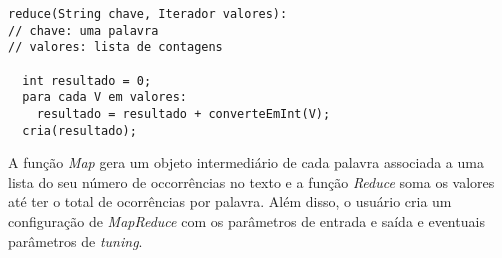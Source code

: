 \begin{lstlisting}[title={Código 2: Exemplo de função Reduce em pseudocódigo adaptado de \cite{MapReduce08}}]
reduce(String chave, Iterador valores):
// chave: uma palavra
// valores: lista de contagens

  int resultado = 0;
  para cada V em valores:
    resultado = resultado + converteEmInt(V);
  cria(resultado);
\end{lstlisting}

A função \textit{Map} gera um objeto intermediário de cada palavra associada a uma lista do seu número de occorrências no texto e a função \textit{Reduce} soma os valores até ter o total de ocorrências por palavra. Além disso, o usuário cria um configuração de \textit{MapReduce} com os parâmetros de entrada e saída e eventuais parâmetros de \textit{tuning}.